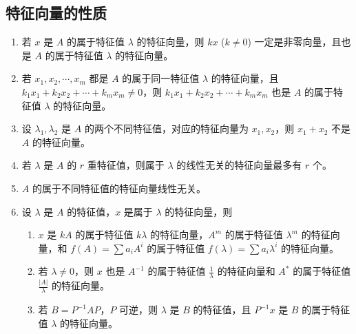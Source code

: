 \documentclass[UTF8]{ctexart}
\theoremstyle{mydef}
\begin{document}
\subsection{特征向量的性质}
\begin{enumerate}
    \item 若 $x$ 是 $A$ 的属于特征值 $\lambda$ 的特征向量，则 $kx$ ($k \neq 0$) 一定是非零向量，且也是 $A$ 的属于特征值 $\lambda$ 的特征向量。
    \item 若 $x_1, x_2, \cdots, x_m$ 都是 $A$ 的属于同一特征值 $\lambda$ 的特征向量，且 $k_1 x_1 + k_2 x_2 + \cdots + k_m x_m \neq 0$，则 $k_1 x_1 + k_2 x_2 + \cdots + k_m x_m$ 也是 $A$ 的属于特征值 $\lambda$ 的特征向量。
    \item 设 $\lambda_1, \lambda_2$ 是 $A$ 的两个不同特征值，对应的特征向量为 $x_1, x_2$，则 $x_1+x_2$ 不是 $A$ 的特征向量。
    \item 若 $\lambda$ 是 $A$ 的 $r$ 重特征值，则属于 $\lambda$ 的线性无关的特征向量最多有 $r$ 个。
    \item $A$ 的属于不同特征值的特征向量线性无关。
    \item 设 $\lambda$ 是 $A$ 的特征值，$x$ 是属于 $\lambda$ 的特征向量，则
    \begin{enumerate}
        \item $x$ 是 $kA$ 的属于特征值 $k\lambda$ 的特征向量，$A^m$ 的属于特征值 $\lambda^m$ 的特征向量，和 $f(A)=\sum a_i A^i$ 的属于特征值 $f(\lambda)=\sum a_i \lambda^i$ 的特征向量。
        \item 若 $\lambda \neq 0$，则 $x$ 也是 $A^{-1}$ 的属于特征值 $\frac{1}{\lambda}$ 的特征向量和 $A^*$ 的属于特征值 $\frac{|A|}{\lambda}$ 的特征向量。
        \item 若 $B=P^{-1}AP$，$P$ 可逆，则 $\lambda$ 是 $B$ 的特征值，且 $P^{-1}x$ 是 $B$ 的属于特征值 $\lambda$ 的特征向量。
    \end{enumerate}
\end{enumerate}
\end{document}
